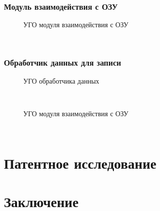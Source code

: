 \documentclass[13pt]{article}
\begin{document}
	\subsubsection{Модуль взаимодействия с ОЗУ}
	\begin{figure}[h!]
		\caption{УГО модуля взаимодействия с ОЗУ}
	\end{figure}\\
	\subsubsection{Обработчик данных для записи}
	\begin{figure}[h!]
		\caption{УГО обработчика данных}
	\end{figure}\\
	\begin{figure}[h!]
		\caption{УГО модуля взаимодействия с ОЗУ}
	\end{figure}\\
	\newpage
	\section{Патентное исследование}
	\newpage
	\setcounter{secnumdepth}{-1}
	\section{Заключение}
	\newpage
	\printbibliography[heading=bibintoc]
	
\end{document}

